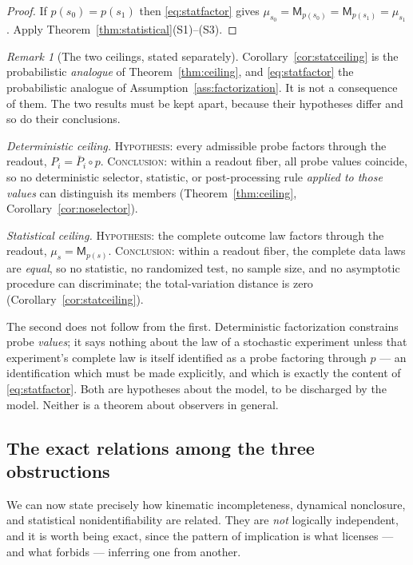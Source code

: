 \documentclass[11pt,reqno]{amsart}
\theoremstyle{plain}
\theoremstyle{definition}
\theoremstyle{remark}
\newtheorem{remark}[theorem]{Remark}
\begin{document}
\begin{proof}
If $p(s_0)=p(s_1)$ then \eqref{eq:statfactor} gives $\mu_{s_0}=\mathsf M_{p(s_0)}=\mathsf M_{p(s_1)}=\mu_{s_1}$. Apply Theorem~\ref{thm:statistical}(S1)--(S3).
\end{proof}

\begin{remark}[The two ceilings, stated separately]\label{rem:twoceilings}
Corollary~\ref{cor:statceiling} is the probabilistic \emph{analogue} of Theorem~\ref{thm:ceiling}, and \eqref{eq:statfactor} the probabilistic analogue of Assumption~\ref{ass:factorization}. It is not a consequence of them. The two results must be kept apart, because their hypotheses differ and so do their conclusions.

\smallskip
\noindent\emph{Deterministic ceiling.} \textsc{Hypothesis:} every admissible probe factors through the readout, $P_i=\bar P_i\circ p$. \textsc{Conclusion:} within a readout fiber, all probe values coincide, so no deterministic selector, statistic, or post-processing rule \emph{applied to those values} can distinguish its members (Theorem~\ref{thm:ceiling}, Corollary~\ref{cor:noselector}).

\smallskip
\noindent\emph{Statistical ceiling.} \textsc{Hypothesis:} the complete outcome law factors through the readout, $\mu_s=\mathsf M_{p(s)}$. \textsc{Conclusion:} within a readout fiber, the complete data laws are \emph{equal}, so no statistic, no randomized test, no sample size, and no asymptotic procedure can discriminate; the total-variation distance is zero (Corollary~\ref{cor:statceiling}).

\smallskip
The second does not follow from the first. Deterministic factorization constrains probe \emph{values}; it says nothing about the law of a stochastic experiment unless that experiment's complete law is itself identified as a probe factoring through $p$ --- an identification which must be made explicitly, and which is exactly the content of \eqref{eq:statfactor}. Both are hypotheses about the model, to be discharged by the model. Neither is a theorem about observers in general.
\end{remark}

\subsection{The exact relations among the three obstructions}\label{subsec:relations}

We can now state precisely how kinematic incompleteness, dynamical nonclosure, and statistical nonidentifiability are related. They are \emph{not} logically independent, and it is worth being exact, since the pattern of implication is what licenses --- and what forbids --- inferring one from another.
\end{document}
